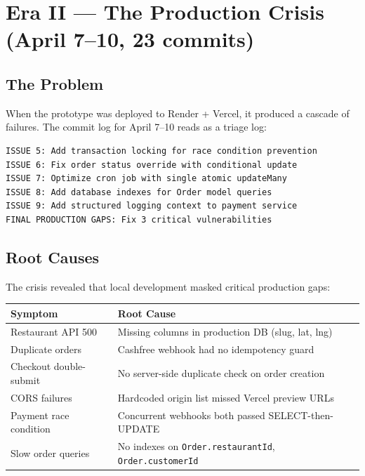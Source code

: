\documentclass[11pt,a4paper,twoside]{book}
\newcommand{\th}[1]{\textbf{\color{white}#1}}
\begin{document}
\section{Era II — The Production Crisis (April 7–10, 23 commits)}

\subsection{The Problem}

When the prototype was deployed to Render + Vercel, it produced a cascade of
failures.  The commit log for April 7–10 reads as a triage log:

\begin{lstlisting}[language=bash,numbers=none]
ISSUE 5: Add transaction locking for race condition prevention
ISSUE 6: Fix order status override with conditional update
ISSUE 7: Optimize cron job with single atomic updateMany
ISSUE 8: Add database indexes for Order model queries
ISSUE 9: Add structured logging context to payment service
FINAL PRODUCTION GAPS: Fix 3 critical vulnerabilities
\end{lstlisting}

\subsection{Root Causes}

The crisis revealed that local development masked critical production gaps:

\begin{center}\small
\begin{tabular}{p{5cm}p{7.5cm}}
\toprule
\rowcolor{headbg}\th{Symptom} & \th{Root Cause} \\
\midrule
Restaurant API 500 & Missing columns in production DB (slug, lat, lng) \\
\rowcolor{rowalt}Duplicate orders & Cashfree webhook had no idempotency guard \\
Checkout double-submit & No server-side duplicate check on order creation \\
\rowcolor{rowalt}CORS failures & Hardcoded origin list missed Vercel preview URLs \\
Payment race condition & Concurrent webhooks both passed SELECT-then-UPDATE \\
\rowcolor{rowalt}Slow order queries & No indexes on \texttt{Order.restaurantId}, \texttt{Order.customerId} \\
\bottomrule
\end{tabular}
\end{center}
\end{document}
